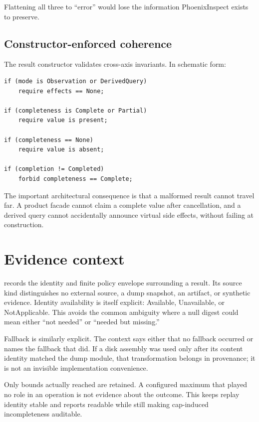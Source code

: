 \documentclass[11pt,oneside,openany]{book}
\newcommand{\typeName}[1]{\texttt{\detokenize{#1}}}
\newcommand{\status}[1]{\textsf{#1}}
\begin{document}
Flattening all three to ``error'' would lose the information PhoenixInspect exists to preserve.

\subsection{Constructor-enforced coherence}

The result constructor validates cross-axis invariants. In schematic form:

\begin{lstlisting}[caption={Representative coherence rules enforced by the result contract. This is schematic rather than a verbatim source extract.}]
if (mode is Observation or DerivedQuery)
    require effects == None;

if (completeness is Complete or Partial)
    require value is present;

if (completeness == None)
    require value is absent;

if (completion != Completed)
    forbid completeness == Complete;
\end{lstlisting}

The important architectural consequence is that a malformed result cannot travel far. A product facade cannot claim a complete value after cancellation, and a derived query cannot accidentally announce virtual side effects, without failing at construction.

\section{Evidence context}

\typeName{EvaluationEvidenceContext} records the identity and finite policy envelope surrounding a result. Its source kind distinguishes no external source, a dump snapshot, an artifact, or synthetic evidence. Identity availability is itself explicit: \status{Available}, \status{Unavailable}, or \status{NotApplicable}. This avoids the common ambiguity where a null digest could mean either ``not needed'' or ``needed but missing.''

Fallback is similarly explicit. The context says either that no fallback occurred or names the fallback that did. If a disk assembly was used only after its content identity matched the dump module, that transformation belongs in provenance; it is not an invisible implementation convenience.

Only bounds actually reached are retained. A configured maximum that played no role in an operation is not evidence about the outcome. This keeps replay identity stable and reports readable while still making cap-induced incompleteness auditable.
\end{document}
